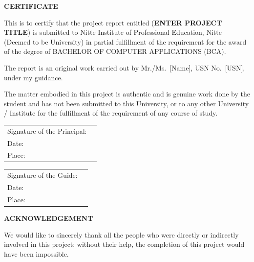 \documentclass[12pt, a4paper]{report}
\begin{document}
\clearpage
\thispagestyle{plain}
\setcounter{page}{1}


\begin{center}
  {\Large\bfseries CERTIFICATE}
\end{center}
\vspace{14pt}

This is to certify that the project report entitled (\textbf{ENTER PROJECT TITLE}) is submitted to Nitte Institute of Professional Education, Nitte (Deemed to be University) in partial fulfillment of the requirement for the award of the degree of BACHELOR OF COMPUTER APPLICATIONS (BCA).

The report is an original work carried out by Mr./Ms.\ [Name], USN No.\ [USN], under my guidance.

The matter embodied in this project is authentic and is genuine work done by the student and has not been submitted to this University, or to any other University / Institute for the fulfillment of the requirement of any course of study.


\vspace{36pt}
\noindent
\begin{tabular}{@{}p{}p{}@{}}
  Signature of the Principal: & \\[24pt]
  Date: & \\[8pt]
  Place: & \\
\end{tabular}

\vspace{36pt}
\noindent
\begin{tabular}{@{}p{}p{}@{}}
  Signature of the Guide: & \\[24pt]
  Date: & \\[8pt]
  Place: & \\
\end{tabular}

\clearpage
\begin{center}
  {\Large\bfseries ACKNOWLEDGEMENT}
\end{center}
\vspace{14pt}

We would like to sincerely thank all the people who were directly or indirectly involved in this project; without their help, the completion of this project would have been impossible.
\end{document}
